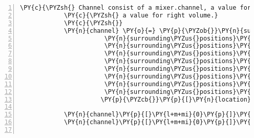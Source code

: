\begin{Verbatim}[commandchars=\\\{\},numbers=left,firstnumber=1,stepnumber=1]
            \PY{c}{\PYZsh{} Channel consist of a mixer.channel, a value for left volume and}
            \PY{c}{\PYZsh{} a value for right volume.}
            \PY{c}{\PYZsh{}}
            \PY{n}{channel} \PY{o}{=} \PY{p}{\PYZob{}}\PY{n}{surrounding\PYZus{}positions}\PY{p}{[}\PY{l+m+mi}{0}\PY{p}{]} \PY{p}{:} \PY{n+nb+bp}{self}\PY{o}{.}\PY{n}{surrounding\PYZus{}position\PYZus{}channels}\PY{p}{[}\PY{l+m+mi}{0}\PY{p}{]}\PY{p}{,}
                       \PY{n}{surrounding\PYZus{}positions}\PY{p}{[}\PY{l+m+mi}{1}\PY{p}{]} \PY{p}{:} \PY{n+nb+bp}{self}\PY{o}{.}\PY{n}{surrounding\PYZus{}position\PYZus{}channels}\PY{p}{[}\PY{l+m+mi}{1}\PY{p}{]}\PY{p}{,}
                       \PY{n}{surrounding\PYZus{}positions}\PY{p}{[}\PY{l+m+mi}{2}\PY{p}{]} \PY{p}{:} \PY{n+nb+bp}{self}\PY{o}{.}\PY{n}{surrounding\PYZus{}position\PYZus{}channels}\PY{p}{[}\PY{l+m+mi}{2}\PY{p}{]}\PY{p}{,}
                       \PY{n}{surrounding\PYZus{}positions}\PY{p}{[}\PY{l+m+mi}{3}\PY{p}{]} \PY{p}{:} \PY{n+nb+bp}{self}\PY{o}{.}\PY{n}{surrounding\PYZus{}position\PYZus{}channels}\PY{p}{[}\PY{l+m+mi}{3}\PY{p}{]}\PY{p}{,}
                       \PY{n}{surrounding\PYZus{}positions}\PY{p}{[}\PY{l+m+mi}{4}\PY{p}{]} \PY{p}{:} \PY{n+nb+bp}{self}\PY{o}{.}\PY{n}{surrounding\PYZus{}position\PYZus{}channels}\PY{p}{[}\PY{l+m+mi}{4}\PY{p}{]}\PY{p}{,}
                       \PY{n}{surrounding\PYZus{}positions}\PY{p}{[}\PY{l+m+mi}{5}\PY{p}{]} \PY{p}{:} \PY{n+nb+bp}{self}\PY{o}{.}\PY{n}{surrounding\PYZus{}position\PYZus{}channels}\PY{p}{[}\PY{l+m+mi}{5}\PY{p}{]}\PY{p}{,}
                       \PY{n}{surrounding\PYZus{}positions}\PY{p}{[}\PY{l+m+mi}{6}\PY{p}{]} \PY{p}{:} \PY{n+nb+bp}{self}\PY{o}{.}\PY{n}{surrounding\PYZus{}position\PYZus{}channels}\PY{p}{[}\PY{l+m+mi}{6}\PY{p}{]}\PY{p}{,}
                       \PY{n}{surrounding\PYZus{}positions}\PY{p}{[}\PY{l+m+mi}{7}\PY{p}{]} \PY{p}{:} \PY{n+nb+bp}{self}\PY{o}{.}\PY{n}{surrounding\PYZus{}position\PYZus{}channels}\PY{p}{[}\PY{l+m+mi}{7}\PY{p}{]}\PY{p}{,}
                       \PY{n}{surrounding\PYZus{}positions}\PY{p}{[}\PY{l+m+mi}{8}\PY{p}{]} \PY{p}{:} \PY{n+nb+bp}{self}\PY{o}{.}\PY{n}{surrounding\PYZus{}position\PYZus{}channels}\PY{p}{[}\PY{l+m+mi}{8}\PY{p}{]}
                      \PY{p}{\PYZcb{}}\PY{p}{[}\PY{n}{location}\PY{p}{]}

            \PY{n}{channel}\PY{p}{[}\PY{l+m+mi}{0}\PY{p}{]}\PY{o}{.}\PY{n}{play}\PY{p}{(}\PY{n}{entity}\PY{o}{.}\PY{n}{assets}\PY{p}{[}\PY{l+s}{\PYZsq{}}\PY{l+s}{audio/ogg}\PY{l+s}{\PYZsq{}}\PY{p}{]}\PY{o}{.}\PY{n}{data}\PY{p}{)}
            \PY{n}{channel}\PY{p}{[}\PY{l+m+mi}{0}\PY{p}{]}\PY{o}{.}\PY{n}{set\PYZus{}volume}\PY{p}{(}\PY{n}{channel}\PY{p}{[}\PY{l+m+mi}{1}\PY{p}{]}\PY{p}{,} \PY{n}{channel}\PY{p}{[}\PY{l+m+mi}{2}\PY{p}{]}\PY{p}{)}


\end{Verbatim}
